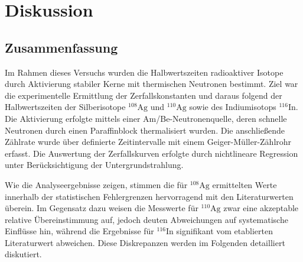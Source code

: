 







\chapter{Diskussion}
\label{ch:Diskussion}

\section{Zusammenfassung}
\label{sec:Zusammenfassung}
Im Rahmen dieses Versuchs wurden die Halbwertszeiten radioaktiver Isotope durch Aktivierung stabiler Kerne mit thermischen Neutronen bestimmt. Ziel war die experimentelle Ermittlung der Zerfallskonstanten und daraus folgend der Halbwertszeiten der Silberisotope $^{108}\text{Ag}$ und $^{110}\text{Ag}$ sowie des Indiumisotops $^{116}\text{In}$. 
Die Aktivierung erfolgte mittels einer Am/Be-Neutronenquelle, deren schnelle Neutronen durch einen Paraffinblock thermalisiert wurden. Die anschließende Zählrate wurde über definierte Zeitintervalle mit einem Geiger-Müller-Zählrohr erfasst. Die Auswertung der Zerfallskurven erfolgte durch nichtlineare Regression unter Berücksichtigung der Untergrundstrahlung.

Wie die Analyseergebnisse zeigen, stimmen die für $^{108}\text{Ag}$ ermittelten Werte innerhalb der statistischen Fehlergrenzen hervorragend mit den Literaturwerten überein. Im Gegensatz dazu weisen die Messwerte für $^{110}\text{Ag}$ zwar eine akzeptable relative Übereinstimmung auf, jedoch deuten Abweichungen auf systematische Einflüsse hin, während die Ergebnisse für $^{116}\text{In}$ signifikant vom etablierten Literaturwert abweichen. Diese Diskrepanzen werden im Folgenden detailliert diskutiert.

